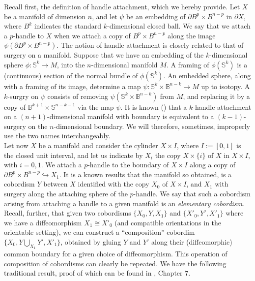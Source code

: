 \documentclass[aps,nofootinbib,amsfonts,superscriptaddress]{revtex4}
\begin{document}
Recall first, the definition of handle attachment, which we hereby provide. Let $X$ be a manifold of dimension $n$, and let $\psi$ be an embedding of $\partial B^p\times B^{n-p}$ in $\partial X$, where $B^k$ indicates the standard $k$-dimensional closed ball. We say that we attach a $p$-handle to $X$ when we attach a copy of $B^p\times B^{n-p}$ along the image $\psi(\partial B^p\times B^{n-p})$. The notion of handle attachment is closely related to that of surgery on a manifold. Suppose that we have an embedding of the $k$-dimensional sphere $\phi: \mathbb S^k \longrightarrow M$, into the $n$-dimensional manifold $M$. A framing of $\phi(\mathbb S^k)$ is a (continuous) section of the normal bundle of $\phi(\mathbb S^k)$. An embedded sphere, along with a framing of its image, determine a map $\psi: \mathbb S^k\times \mathbb B^{n-k}\longrightarrow M$ up to isotopy. A $k$-surgry on $\psi$ consists of removing $\psi(\mathbb S^k\times \mathbb B^{n-k})$ from $M$, and replacing it by a copy of $\mathbb B^{k+1}\times \mathbb S^{n-k-1}$ via the map $\psi$. It is known (\cite{Kos,4Manifolds}) that a $k$-handle attachment on a $(n+1)$-dimensional manifold with boundary is equivalent to a $(k-1)$-surgery on the $n$-dimensional boundary. We will therefore, sometimes, improperly use the two names interchangeably.  \\

Let now $X$ be a manifold and consider the cylinder $X\times I$, where $I:= [0,1]$ is the closed unit interval, and let us indicate by $X_i$ the copy $X\times \{i\}$ of $X$ in $X\times I$, with $i=0,1$. We attach a $p$-handle to the boundary of $X\times I$ along a copy of $\partial B^p\times B^{n-p}\hookrightarrow X_1$. It is a known results that the manifold so obtained, is a cobordism $Y$ between $X$ identified with the copy $X_0$ of $X\times I$, and $X_1$ with surgery along the attaching sphere of the $p$-handle. We say that such a cobordism arising from attaching a handle to a given manifold is an {\it elementary cobordism}. \\

Recall, further, that given two cobordisms $\{X_0,Y,X_1\}$ and $\{X'_0,Y',X'_1\}$ where we have a diffeomorphism $X_1 \cong X'_0$ (and compatible orientations in the orientable setting), we can construct a ``composition'' cobordim $\{X_0,Y\bigcup_{X_1}Y',X'_1\}$, obtained by gluing $Y$ and $Y'$ along their (diffeomorphic) common boundary for a given choice of diffeomorphism. This operation of composition of cobordisms can clearly be repeated. We have the following traditional result, proof of which can be found in \cite{Kos}, Chapter $7$. 
\end{document}
